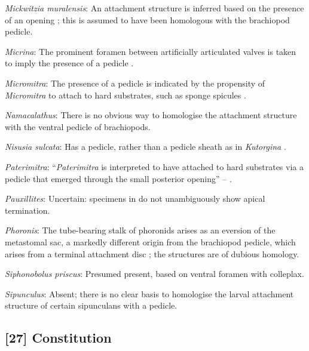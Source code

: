 \documentclass[openany]{book}
\begin{document}
\hypertarget{Mickwitzia_muralensis-coding-26}{}
\emph{Mickwitzia muralensis}: An attachment structure is inferred based
on the presence of an opening \citep{Balthasar2004Shellstructure}; this
is assumed to have been homologous with the brachiopod pedicle.

\hypertarget{Micrina-coding-26}{}
\emph{Micrina}: The prominent foramen between artificially articulated
valves is taken to imply the presence of a pedicle
\citep{Holmer2008TheEarly}.

\hypertarget{Micromitra-coding-26}{}
\emph{Micromitra}: The presence of a pedicle is indicated by the
propensity of \emph{Micromitra} to attach to hard substrates, such as
sponge spicules \citep{Holmer2006Aspinose}.

\hypertarget{Namacalathus-coding-26}{}
\emph{Namacalathus}: There is no obvious way to homologise the
attachment structure with the ventral pedicle of brachiopods.

\hypertarget{Nisusia_sulcata-coding-26}{}
\emph{Nisusia sulcata}: Has a pedicle, rather than a pedicle sheath as
in \emph{Kutorgina}
\citep{Holmer2018Evolutionarysignificance, Holmer2018Theattachment}.

\hypertarget{Paterimitra-coding-26}{}
\emph{Paterimitra}: ``\emph{Paterimitra} is interpreted to have attached
to hard substrates via a pedicle that emerged through the small
posterior opening'' -- \citet{Skovsted2009Thescleritome}.

\hypertarget{Pauxillites-coding-26}{}
\emph{Pauxillites}: Uncertain: specimens in \citet{Valent2015} do not
unambiguously show apical termination.

\hypertarget{Phoronis-coding-26}{}
\emph{Phoronis}: The tube-bearing stalk of phoronids arises as an
eversion of the metastomal sac, a markedly different origin from the
brachiopod pedicle, which arises from a terminal attachment disc
\citep{Young2002}; the structures are of dubious homology.

\hypertarget{Siphonobolus_priscus-coding-26}{}
\emph{Siphonobolus priscus}: Presumed present, based on ventral foramen
with colleplax.

\hypertarget{Sipunculus-coding-26}{}
\emph{Sipunculus}: Absent; there is no clear basis to homologise the
larval attachment structure of certain sipunculans with a pedicle.

\subsection*{{[}27{]} Constitution}\label{constitution-1}
\end{document}
